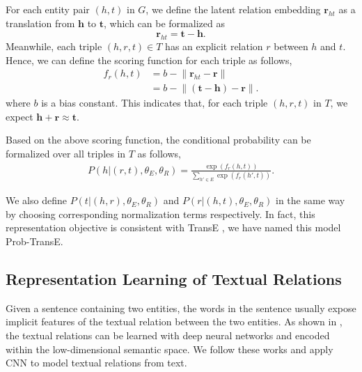 \documentclass[11pt,a4paper]{article}
\begin{document}
For each entity pair $(h, t)$ in $G$, we define the latent relation embedding $\mathbf{r}_{ht}$ as a translation from $\mathbf{h}$ to $\mathbf{t}$, which can be formalized as
\begin{equation}
\textbf{r}_{ht} = \textbf{t} - \textbf{h}.
\end{equation}
Meanwhile, each triple $(h, r, t) \in T$ has an explicit relation $r$ between $h$ and $t$. Hence, we can define the scoring function for each triple as follows,
\begin{align}
f_r(h, t) & = b - \lVert \textbf{r}_{ht} - \textbf{r} \rVert  \\\nonumber
		& = b - \lVert (\textbf{t} - \textbf{h}) - \textbf{r}  \rVert.
\end{align}
where $b$ is a bias constant. This indicates that, for each triple $(h, r, t)$ in $T$, we expect $\textbf{h} + \textbf{r} \approx \textbf{t}$.

Based on the above scoring function, the conditional probability can be formalized over all triples in $T$ as follows,
\begin{align}
P(h|(r, t),{\theta_E, \theta_R}) = \frac{\exp(f_r(h, t))}{\sum_{h' \in E} \exp(f_r(h', t))}.
\end{align}

We also define $P(t|(h, r), {\theta_E, \theta_R})$ and $P(r|(h, t),{\theta_E, \theta_R})$ in the same way by choosing corresponding normalization terms respectively. In fact, this representation objective is consistent with TransE \cite{bordes2013translating}, we have named this model Prob-TransE.

\subsection{Representation Learning of Textual Relations}
\label{sec:relation}

Given a sentence containing two entities, the words in the sentence usually expose implicit features of the textual relation between the two entities. As shown in \cite{zeng2014relation,toutanova2015representing,lin2016neural}, the textual relations can be learned with deep neural networks and encoded within the low-dimensional semantic space. We follow these works and apply CNN to model textual relations from text. 


\end{document}
